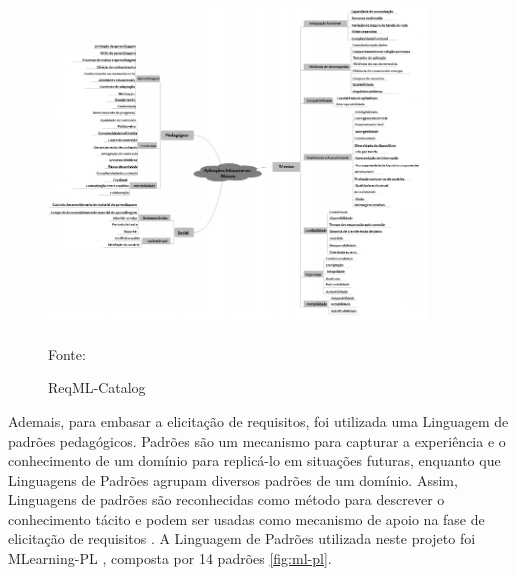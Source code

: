 \begin{figure}[H]
\centering
    \caption{ReqML-Catalog}
    \label{fig:reqML}
    \includegraphics[width=0.9\textwidth]{Figuras/reqML-catalog.png}
    
    Fonte: \cite{soad2017reqml}
\end{figure}

Ademais, para embasar a elicitação de requisitos, foi utilizada uma Linguagem de padrões pedagógicos. Padrões são um mecanismo para capturar a experiência e o conhecimento de um domínio para replicá-lo em situações futuras, enquanto que Linguagens de Padrões agrupam diversos padrões de um domínio. Assim, Linguagens de padrões são reconhecidas como método para descrever o conhecimento tácito e podem ser usadas como mecanismo de apoio na fase de elicitação de requisitos
\citep{Pressman2014}. A Linguagem de Padrões utilizada neste projeto foi MLearning-PL \citep{Fioravanti2017_plop}, composta por 14 padrões \ref{fig:ml-pl}.

